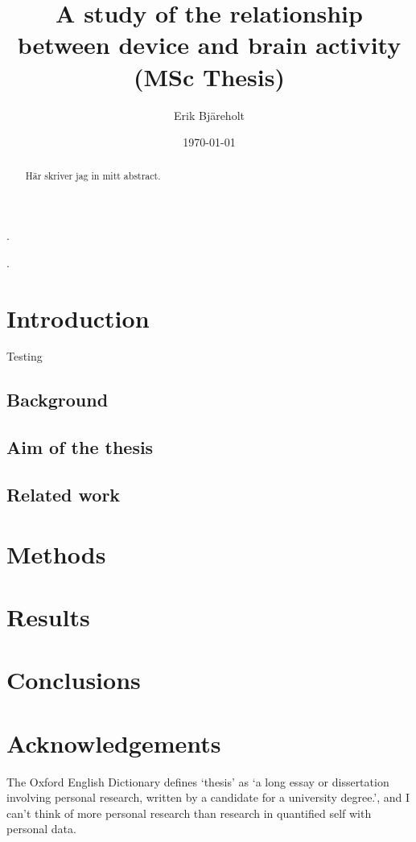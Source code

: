 \documentclass[a4paper]{article}
\title{A study of the relationship between device and brain activity (MSc Thesis)}
\author{Erik Bjäreholt}
\date{\today}
\begin{document}
\maketitle

\begin{abstract}
Här skriver jag in mitt abstract.
\end{abstract}

\pagebreak.\pagebreak

\tableofcontents

\pagebreak.\pagebreak

\section{Introduction}

Testing~\cite{einstein}

\subsection{Background}

\subsection{Aim of the thesis}

\subsection{Related work}

\section{Methods}

\section{Results}

\section{Conclusions}

\section*{Acknowledgements}

The Oxford English Dictionary defines `thesis' as `a long essay or dissertation involving personal research, written by a candidate for a university degree.', and I can't think of more personal research than research in quantified self with personal data.
\end{document}
